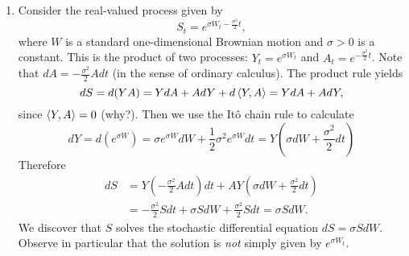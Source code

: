 \begin{example}
\begin{enumerate}[\upshape (i)]
    \item Consider the real-valued process given by
    \begin{equation*}
        S_t = e^{\sigma W_t-\frac{\sigma^2}{2}t},
    \end{equation*}
    where $W$ is a standard one-dimensional Brownian motion and $\sigma>0$ is a constant. This is the product of two processes: $Y_t = e^{\sigma W_t}$ and $A_t=e^{-\frac{\sigma^2}{2}t}$. Note that $dA = -\frac{\sigma^2}{2}A dt$ (in the sense of ordinary calculus). The product rule yields
    \begin{equation*}
        dS = d(YA) = YdA + AdY + d\braket{Y,A} = YdA + AdY,
    \end{equation*}
    since $\braket{Y,A}=0$ (why?). Then we use the It\^{o} chain rule to calculate
    \begin{equation*}
        dY = d(e^{\sigma W}) = \sigma e^{\sigma W}dW + \frac{1}{2}\sigma^2 e^{\sigma W}dt = Y\left(\sigma dW + \frac{\sigma^2}{2}dt\right)
    \end{equation*}
    Therefore
    \begin{align*}
        dS &= Y\left(-\frac{\sigma^2}{2}A dt\right)dt + AY\left(\sigma dW+\frac{\sigma^2}{2}dt\right) \\
        &= -\frac{\sigma^2}{2}Sdt + \sigma SdW + \frac{\sigma^2}{2}Sdt = \sigma SdW.
    \end{align*}
    We discover that $S$ solves the stochastic differential equation $dS = \sigma SdW$. Observe in particular that the solution is \emph{not} simply given by $e^{\sigma W_t}$.


\end{enumerate}
\end{example}
